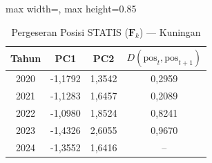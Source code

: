 \begin{table}[H]
\centering
\caption{Pergeseran Posisi STATIS ($\mathbf{F}_k$) --- Kuningan} \label{tab:app1jarak_statis_skor_kuningan}
\begin{adjustbox}{max width=\textwidth, max height=0.85\textheight}
\begin{tabular}{|c|c|c|c|}
\hline
\textbf{Tahun} & \textbf{PC1} & \textbf{PC2} & \textbf{$D(\text{pos}_t, \text{pos}_{t+1})$} \\
\hline
2020 & -1,1792 & 1,3542 & 0,2959 \\
2021 & -1,1283 & 1,6457 & 0,2089 \\
2022 & -1,0980 & 1,8524 & 0,8241 \\
2023 & -1,4326 & 2,6055 & 0,9670 \\
2024 & -1,3552 & 1,6416 & -- \\
\hline
\end{tabular}
\end{adjustbox}
\end{table}